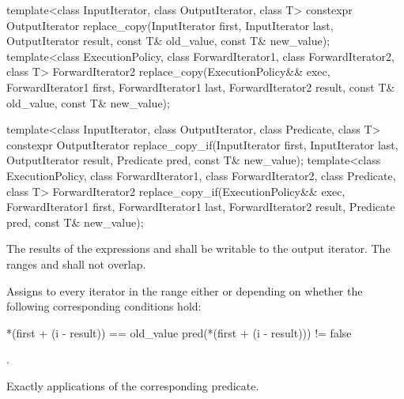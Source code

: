 %
%
\begin{itemdecl}
template<class InputIterator, class OutputIterator, class T>
  constexpr OutputIterator
    replace_copy(InputIterator first, InputIterator last,
                 OutputIterator result,
                 const T& old_value, const T& new_value);
template<class ExecutionPolicy, class ForwardIterator1, class ForwardIterator2, class T>
  ForwardIterator2
    replace_copy(ExecutionPolicy&& exec,
                 ForwardIterator1 first, ForwardIterator1 last,
                 ForwardIterator2 result,
                 const T& old_value, const T& new_value);

template<class InputIterator, class OutputIterator, class Predicate, class T>
  constexpr OutputIterator
    replace_copy_if(InputIterator first, InputIterator last,
                    OutputIterator result,
                    Predicate pred, const T& new_value);
template<class ExecutionPolicy, class ForwardIterator1, class ForwardIterator2,
         class Predicate, class T>
  ForwardIterator2
    replace_copy_if(ExecutionPolicy&& exec,
                    ForwardIterator1 first, ForwardIterator1 last,
                    ForwardIterator2 result,
                    Predicate pred, const T& new_value);
\end{itemdecl}

\begin{itemdescr}
\pnum
\requires
The results of the expressions
and
shall be writable to the
output iterator.
The ranges
and
shall not overlap.

\pnum
\effects
Assigns to every iterator
in the
range
either
or
depending on whether the following corresponding conditions hold:

\begin{codeblock}
*(first + (i - result)) == old_value
pred(*(first + (i - result))) != false
\end{codeblock}

\pnum
\returns
{}.

\pnum
\complexity
Exactly
applications of the corresponding predicate.
\end{itemdescr}

